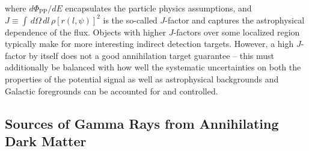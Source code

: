 where $d\Phi_\mathrm{PP}/dE$ encapsulates the particle physics assumptions, and $J\equiv\int\,d\Omega\,dl\,\rho[r(l,\psi)]^2$ is the so-called $J$-factor and captures the astrophysical dependence of the flux. Objects with higher $J$-factors over some localized region typically make for more interesting indirect detection targets. However, a high $J$-factor by itself does not a good annihilation target guarantee -- this must additionally be balanced with how well the systematic uncertainties on both the properties of the potential signal as well as astrophysical backgrounds and Galactic foregrounds can be accounted for and controlled.

\subsection{Sources of Gamma Rays from Annihilating Dark Matter}
\label{subsec:dmsources}

